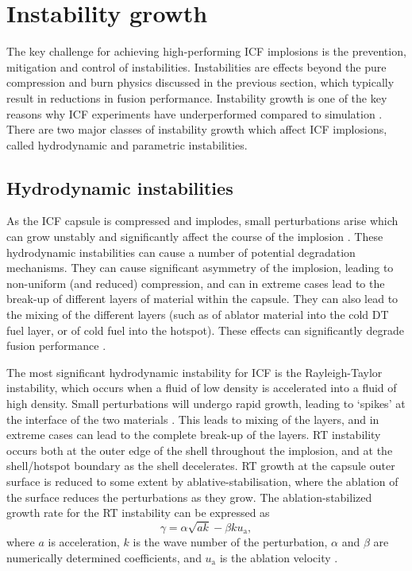 \section{Instability growth}
The key challenge for achieving high-performing ICF implosions is the prevention, mitigation and control of instabilities. Instabilities are effects beyond the pure compression and burn physics discussed in the previous section, which typically result in reductions in fusion performance. Instability growth is one of the key reasons why ICF experiments have underperformed compared to simulation \cite{Lindl2014, Hurricane2014, Smalyuk2020}. There are two major classes of instability growth which affect ICF implosions, called hydrodynamic and parametric instabilities.

\subsection{Hydrodynamic instabilities} \label{Hydro instabilities}
As the ICF capsule is compressed and implodes, small perturbations arise which can grow unstably and significantly affect the course of the implosion \cite{Atzeni2008}. These hydrodynamic instabilities can cause a number of potential degradation mechanisms. They can cause significant asymmetry of the implosion, leading to non-uniform (and reduced) compression, and can in extreme cases lead to the break-up of different layers of material within the capsule. They can also lead to the mixing of the different layers (such as of ablator material into the cold DT fuel layer, or of cold fuel into the hotspot). These effects can significantly degrade fusion performance \cite{Ma2013}.

The most significant hydrodynamic instability for ICF is the Rayleigh-Taylor instability, which occurs when a fluid of low density is accelerated into a fluid of high density. Small perturbations will undergo rapid growth, leading to `spikes' at the interface of the two materials \cite{Atzeni2008}. This leads to mixing of the layers, and in extreme cases can lead to the complete break-up of the layers. RT instability occurs both at the outer edge of the shell throughout the implosion, and at the shell/hotspot boundary as the shell decelerates. RT growth at the capsule outer surface is reduced to some extent by ablative-stabilisation, where the ablation of the surface reduces the perturbations as they grow. The ablation-stabilized growth rate for the RT instability can be expressed as
\begin{equation} \gamma = \alpha \sqrt{ak} - \beta k u_\mathrm{a}, \label{eq:RTI} \end{equation}
where $a$ is acceleration, $k$ is the wave number of the perturbation, $\alpha$ and $\beta$ are numerically determined coefficients, and $u_\mathrm{a}$ is the ablation velocity \cite{Takabe1985, Betti1998}.

